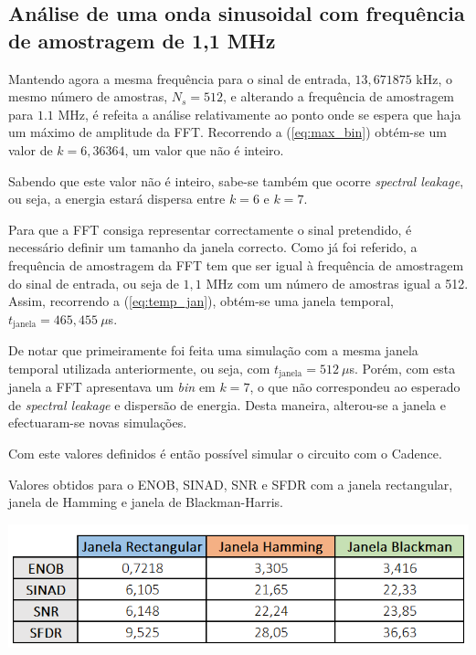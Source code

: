 \documentclass[11pt]{article}
\numberwithin{equation}{section}
\begin{document}
\subsection{Análise de uma onda sinusoidal com frequência de amostragem de 1,1 MHz}

Mantendo agora a mesma frequência para o sinal de entrada, $13,671875$ kHz, o mesmo número de amostras, $N_{s} = 512$, e alterando a frequência de amostragem para $1.1$ MHz, é refeita a análise relativamente ao ponto onde se espera que haja um máximo de amplitude da FFT. Recorrendo a (\ref{eq:max_bin}) obtém-se um valor de $k = 6,36364$, um valor que não é inteiro. 

Sabendo que este valor não é inteiro, sabe-se também que ocorre \textit{spectral leakage}, ou seja, a energia estará dispersa entre $k = 6$ e $k = 7$.

Para que a FFT consiga representar correctamente o sinal pretendido, é necessário definir um tamanho da janela correcto. Como já foi referido, a frequência de amostragem da FFT tem que ser igual à frequência de amostragem do sinal de entrada, ou seja de $1,1$ MHz com um número de amostras igual a 512. Assim, recorrendo a (\ref{eq:temp_jan}), obtém-se uma janela temporal, $t_{\text{janela}} = 465,455~\mu$s.

De notar que primeiramente foi feita uma simulação com a mesma janela temporal utilizada anteriormente, ou seja, com $t_{\text{janela}} = 512~\mu$s. Porém, com esta janela a FFT apresentava um \textit{bin} em $k = 7$, o que não correspondeu ao esperado de \textit{spectral leakage} e dispersão de energia. Desta maneira, alterou-se a janela e efectuaram-se novas simulações.

Com este valores definidos é então possível simular o circuito com o Cadence.

\begin{table}[H]
	\centering
	\caption{Valores obtidos para o ENOB, SINAD, SNR e SFDR com a janela rectangular, janela de Hamming e janela de Blackman-Harris.}
 	\includegraphics[keepaspectratio=true, scale=0.50]{lab/janelas.png}
\end{table}
\end{document}
